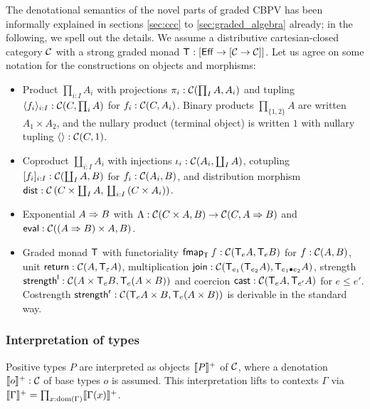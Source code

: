 \documentclass[acmsmall,review,anonymous]{acmart}\settopmatter{printfolios=true,printccs=false,printacmref=false}
\theoremstyle{remark}
\begin{document}
The denotational semantics of the novel parts
of graded CBPV has been informally explained in
sections \ref{sec:ccc} to \ref{sec:graded_algebra} already; in the following,
we spell out the details.  We assume a distributive cartesian-closed
category $\CC$ with a strong graded monad $\T : [\Eff \to [\CC \to \CC]]$.
Let us agree on some notation for the constructions on objects and
morphisms:
\begin{itemize}
\item Product $\prod_{i:I} A_i$ with projections $\pi_i : \CC(\prod_I
  A, A_i)$ and tupling $\langle f_i
  \rangle_{i:I} : \CC(C,\prod_i A)$ for $f_i : \CC(C,A_i)$.  Binary
  products $\prod_{\{1,2\}} A$ are written $A_1 \times A_2$,
  and the nullary product (terminal object)
  is written $1$ with nullary tupling $\langle\rangle : \CC(C,1)$.
\item Coproduct $\coprod_{i:I} A_i$ with injections $\iota_i :
  \CC(A_i,\coprod_I A)$,
  cotupling $[f_i]_{i:I} : \CC(\coprod_I A, B)$ for $f_i : \CC(A_i,B)$,
  and distribution morphism
  $\tdist : \Hom {C \times \coprod_I A} {\coprod_{i:I} {(C \times A_i)}}$.
\item Exponential $A \To B$ with $\Lambda : \CC(C \times A, B) \to
  \CC(C, A \To B)$ and $\teval : \CC((A \To B) \times A, B)$.
\item Graded monad $\T$ with functoriality $\fmap[\T] f :
  \CC(\T[e]A,\T[e]B)$ for $f : \CC(A,B)$,
  unit $\treturn : \CC(A,\T[\Ge]A)$,
  multiplication $\tjoin : \CC(\T[e_1](\T[e_2]A),\T[e_1 \bu e_2]A)$,
  strength $\strengthl : \CC(A \times \T[e]B, \T[e](A \times B))$ and
  coercion $\tcast : \CC(\T[e]A,\T[e']A)$ for $e \leq e'$.
  Costrength $\strengthr : \CC(\T[e]A \times B, \T[e](A \times B))$
  is derivable in the standard way.
\end{itemize}

\subsubsection{Interpretation of types}

Positive types $P$ are interpreted as objects $\denp P$ of $\CC$,
where a denotation $\denp o : \CC$ of base types $o$ is assumed.
This interpretation lifts to contexts $\Gamma$ via $\denp \Gamma =
\prod_{x:\dom(\Gamma)} \denp{\Gamma(x)}$.
\end{document}
